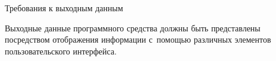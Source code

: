 \subsubsection{} Требования к выходным данным
\label{sec:analysis:research:req:outputs}

Выходные данные программного средства должны быть представлены посредством отображения информации с~помощью различных элементов пользовательского интерфейса.